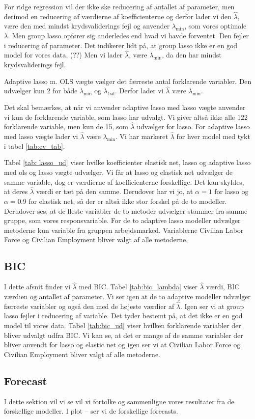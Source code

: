 For ridge regression vil der ikke ske reducering af antallet af parameter, men derimod en reducering af værdierne af koefficienterne og derfor lader vi den $\widehat{\lambda}$, være den med mindst krydsvaliderings fejl og anvender $\lambda_{\min}$, som vores optimale $\lambda$. 
%
Men group lasso opfører sig anderledes end hvad vi havde forventet. 
Den fejler i reducering af parameter. 
Det indikerer lidt på, at group lasso ikke er en god model for vores data. (??)
Men vi lader $\widehat{\lambda}$, være $\lambda_{\min}$, da den har mindst krydsvaliderings fejl. 

Adaptive lasso m. OLS vægte vælger det færreste antal forklarende variabler. 
Den udvælger kun 2 for både  $\lambda_{\min}$ og $\lambda_{1\text{sd}}$. 
Derfor lader vi $\widehat{\lambda}$ være $\lambda_{\min}$. 

Det skal bemærkes, at når vi anvender adaptive lasso med lasso vægte anvender vi kun de forklarende variable, som lasso har udvalgt. 
Vi giver altså ikke alle 122 forklarende variable, men kun de 15, som $\widehat{\lambda}$ udvælger for lasso.
For adaptive lasso med lasso vægte lader vi $\widehat{\lambda}$ være $\lambda_{\min}$.  
Vi har markeret $\widehat{\lambda}$ for hver model med tykt i tabel  \ref{tab:cv_tab}. 

Tabel \ref{tab: lasso_ud} viser hvilke koefficienter elastisk net, lasso og adaptive lasso med ols og lasso vægte udvælger. 
Vi får at lasso og elastisk net udvælger de samme variable, dog er værdierne af koefficienterne forskellige. 
Det kan skyldes, at deres $\widehat{\lambda}$ værdi er tæt på den samme. 
Derudover har vi jo, at $\alpha = 1$ for lasso og $\alpha = 0.9$ for elastisk net, så der er altså ikke stor forskel på de to modeller. 
Derudover ses, at de fleste variabler de to metoder udvælger stammer fra samme gruppe, som vores responsvariable.  
For de to adaptive lasso modeller udvælger metoderne kun variable fra gruppen arbejdsmarked. 
Variablerne Civilian Labor Force og Civilian Employment bliver valgt af alle metoderne. 



\newpage
\subsection{BIC}
I dette afsnit finder vi $\widehat{\lambda}$ med BIC. 
Tabel \ref{tab:bic_lambda} viser $\widehat{\lambda}$ værdi, BIC værdien og antallet af parameter. Vi ser igen at de to adaptive modeller udvælger færreste variabler og også den med de højeste værdier af $\widehat{\lambda}$. 
Igen ser vi at group lasso fejler i reducering af variable. Det tyder bestemt på, at det ikke er en god model til vores data. 
Tabel \ref{tab:bic_ud} viser hvilken forklarende variabler der bliver udvalgt udfra BIC. 
Vi kan se, at det er mange af de samme variabler der bliver anvendt for lasso og elastic net og igen ser vi at Civilian Labor Force og Civilian Employment bliver valgt af alle metoderne. 




\subsection{Forecast}
I dette sektion vil vi se vil vi fortolke og sammenligne vores resultater fra de forskellige modeller. 
I plot -- ser vi de forskellige forecasts. 
